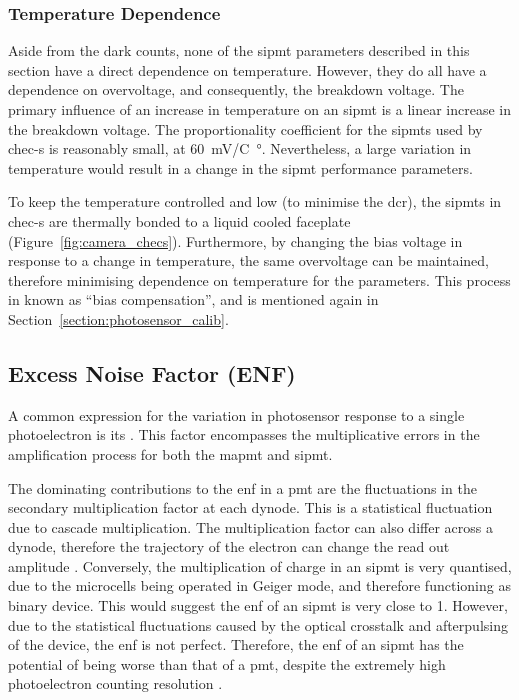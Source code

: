 \subsubsection{Temperature Dependence}

Aside from the dark counts, none of the \gls{sipmt} parameters described in this section have a direct dependence on temperature. However, they do all have a dependence on overvoltage, and consequently, the breakdown voltage. The primary influence of an increase in temperature on an \gls{sipmt} is a linear increase in the breakdown voltage. The proportionality coefficient for the \glspl{sipmt} used by \gls{chec-s} is reasonably small, at \SI{60}{mV/C\degree}. Nevertheless, a large variation in temperature would result in a change in the \gls{sipmt} performance parameters.

To keep the temperature controlled and low (to minimise the \gls{dcr}), the \glspl{sipmt} in \gls{chec-s} are thermally bonded to a liquid cooled faceplate (Figure~\ref{fig:camera_checs}). Furthermore, by changing the bias voltage in response to a change in temperature, the same overvoltage can be maintained, therefore minimising dependence on temperature for the parameters. This process in known as ``bias compensation'', and is mentioned again in Section~\ref{section:photosensor_calib}.

\subsection{Excess Noise Factor (ENF)} \label{section:enf}

A common expression for the variation in photosensor response to a single photoelectron is its . This factor encompasses the multiplicative errors in the amplification process for both the \gls{mapmt} and \gls{sipmt}. 

The dominating contributions to the \gls{enf} in a \gls{pmt} are the fluctuations in the secondary multiplication factor at each dynode. This is a statistical fluctuation due to cascade multiplication. The multiplication factor can also differ across a dynode, therefore the trajectory of the electron can change the read out amplitude \cite{HAMAMATSU2007}. Conversely, the multiplication of charge in an \gls{sipmt} is very quantised, due to the microcells being operated in Geiger mode, and therefore functioning as binary device. This would suggest the \gls{enf} of an \gls{sipmt} is very close to 1. However, due to the statistical fluctuations caused by the optical crosstalk and afterpulsing of the device, the \gls{enf} is not perfect. Therefore, the \gls{enf} of an \gls{sipmt} has the potential of being worse than that of a \gls{pmt}, despite the extremely high photoelectron counting resolution \cite{Vinogradov2012}.

